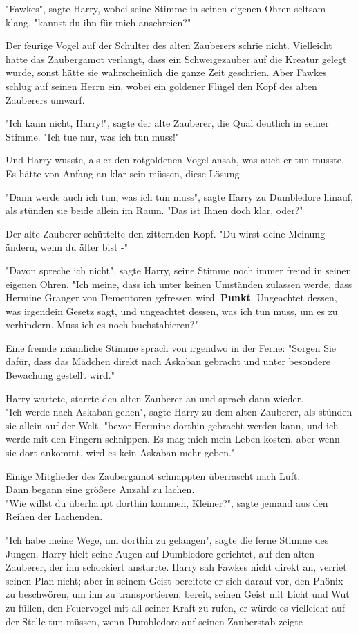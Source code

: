 {"Fawkes", sagte Harry, wobei seine Stimme in seinen eigenen Ohren seltsam klang, "kannst du ihn für mich anschreien?"

Der feurige Vogel auf der Schulter des alten Zauberers schrie nicht. Vielleicht hatte das Zaubergamot verlangt, dass ein Schweigezauber auf die Kreatur gelegt wurde, sonst hätte sie wahrscheinlich die ganze Zeit geschrien. Aber Fawkes schlug auf seinen Herrn ein, wobei ein goldener Flügel den Kopf des alten Zauberers umwarf.

"Ich kann nicht, Harry!", sagte der alte Zauberer, die Qual deutlich in seiner Stimme. "Ich tue nur, was ich tun muss!"

Und Harry wusste, als er den rotgoldenen Vogel ansah, was auch er tun musste. Es hätte von Anfang an klar sein müssen, diese Lösung.

"Dann werde auch ich tun, was ich tun muss", sagte Harry zu Dumbledore hinauf, als stünden sie beide allein im Raum. "Das ist Ihnen doch klar, oder?"

Der alte Zauberer schüttelte den zitternden Kopf. "Du wirst deine Meinung ändern, wenn du älter bist -"

"Davon spreche ich nicht", sagte Harry, seine Stimme noch immer fremd in seinen eigenen Ohren. "Ich meine, dass ich unter keinen Umständen zulassen werde, dass Hermine Granger von Dementoren gefressen wird. \textbf{Punkt}. Ungeachtet dessen, was irgendein Gesetz sagt, und ungeachtet dessen, was ich tun muss, um es zu verhindern. Muss ich es noch buchstabieren?"

Eine fremde männliche Stimme sprach von irgendwo in der Ferne: "Sorgen Sie dafür, dass das Mädchen direkt nach Askaban gebracht und unter besondere Bewachung gestellt wird."

Harry wartete, starrte den alten Zauberer an und sprach dann wieder.\\ "Ich werde nach Askaban gehen", sagte Harry zu dem alten Zauberer, als stünden sie allein auf der Welt, "bevor Hermine dorthin gebracht werden kann, und ich werde mit den Fingern schnippen. Es mag mich mein Leben kosten, aber wenn sie dort ankommt, wird es kein Askaban mehr geben."

Einige Mitglieder des Zaubergamot schnappten überrascht nach Luft.\\ Dann begann eine größere Anzahl zu lachen.\\ "Wie willst du überhaupt dorthin kommen, Kleiner?", sagte jemand aus den Reihen der Lachenden.

"Ich habe meine Wege, um dorthin zu gelangen", sagte die ferne Stimme des Jungen. Harry hielt seine Augen auf Dumbledore gerichtet, auf den alten Zauberer, der ihn schockiert anstarrte. Harry sah Fawkes nicht direkt an, verriet seinen Plan nicht; aber in seinem Geist bereitete er sich darauf vor, den Phönix zu beschwören, um ihn zu transportieren, bereit, seinen Geist mit Licht und Wut zu füllen, den Feuervogel mit all seiner Kraft zu rufen, er würde es vielleicht auf der Stelle tun müssen, wenn Dumbledore auf seinen Zauberstab zeigte -

}
